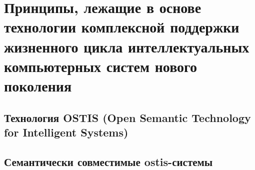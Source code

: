 \chapter{Принципы, лежащие в основе технологии комплексной поддержки жизненного цикла интеллектуальных компьютерных систем нового поколения}
\label{chapter_ostis_tech} 


\section{Технология OSTIS (Open Semantic Technology for Intelligent Systems)}
\section{Семантически совместимые ostis-системы}

%